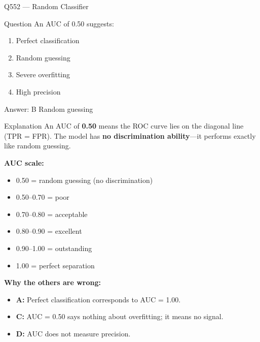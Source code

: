 \documentclass[aspectratio=169,8pt]{beamer}
\begin{document}
	\begin{frame}{Q552 --- Random Classifier}
		\begin{block}{Question}
			An AUC of 0.50 suggests:
			\begin{enumerate}
				\item Perfect classification
				\item Random guessing
				\item Severe overfitting
				\item High precision
			\end{enumerate}
		\end{block}
		
		\begin{exampleblock}{Answer: B}
			Random guessing
		\end{exampleblock}
		
		\begin{block}{Explanation}
			An AUC of \textbf{0.50} means the ROC curve lies on the diagonal line
			(TPR = FPR). The model has \textbf{no discrimination ability}---it performs
			exactly like random guessing.
			
			\textbf{AUC scale:}
			\begin{itemize}
				\item 0.50 = random guessing (no discrimination)
				\item 0.50--0.70 = poor
				\item 0.70--0.80 = acceptable
				\item 0.80--0.90 = excellent
				\item 0.90--1.00 = outstanding
				\item 1.00 = perfect separation
			\end{itemize}
			
			\textbf{Why the others are wrong:}
			\begin{itemize}
				\item \textbf{A:} Perfect classification corresponds to AUC = 1.00.
				\item \textbf{C:} AUC = 0.50 says nothing about overfitting; it means no
				signal.
				\item \textbf{D:} AUC does not measure precision.
			\end{itemize}
		\end{block}
	\end{frame}
	
\end{document}
